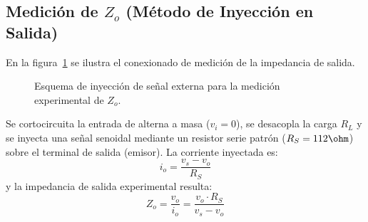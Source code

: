 \subsection{Medición de \texorpdfstring{$Z_o$}{Zo} (Método de Inyección en Salida)}
En la figura~\ref{crkt:medicion_zo} se ilustra el conexionado de medición de la impedancia de salida.

\begin{figure}[!ht]
  \centering
  
  \caption{Esquema de inyección de señal externa para la medición experimental de $Z_o$.}
  \label{crkt:medicion_zo}
\end{figure}

Se cortocircuita la entrada de alterna a masa ($v_i = 0$), se desacopla la carga $R_L$ y se inyecta una señal senoidal
mediante un resistor serie patrón ($R_S = 112\ohm$) sobre el terminal de salida (emisor). La corriente inyectada es:
\begin{equation}
  i_o = \frac{v_s - v_o}{R_S}
\end{equation}
y la impedancia de salida experimental resulta:
\begin{equation}
  Z_o = \frac{v_o}{i_o} = \frac{v_o \cdot R_S}{v_s - v_o}
  \label{eq:Zo_exp_formula}
\end{equation}
